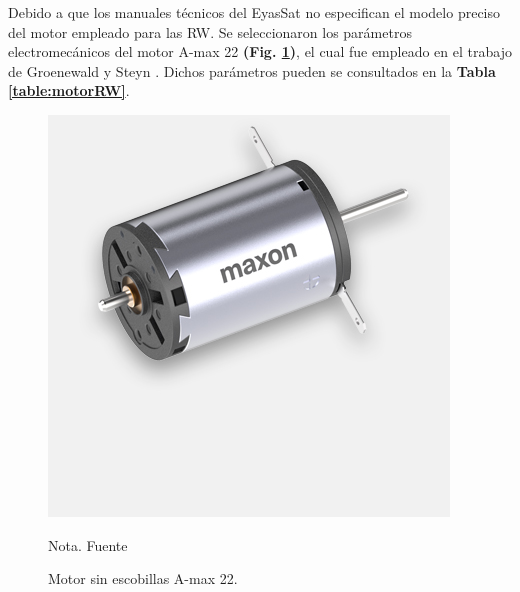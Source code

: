 Debido a que los manuales técnicos del EyasSat no especifican el modelo preciso del motor empleado para las RW. Se seleccionaron los parámetros electromecánicos del motor A-max 22 \textbf{(Fig. \ref{fig:motorRW})}, el cual fue empleado en el trabajo de Groenewald y Steyn \cite{Groenewald2014}. Dichos parámetros pueden se consultados en la \textbf{Tabla \ref{table:motorRW}}.


\begin{figure}[h]
	\begin{center}
		\includegraphics[scale=0.35]{imagenes/modelo_dinamico/motorRW.jpg}\\
	\end{center}
	\caption{Motor sin escobillas A-max 22.}
	\label{fig:motorRW}
	\footnotesize{Nota. Fuente \cite{maxon2023}}
\end{figure}

